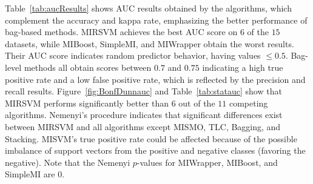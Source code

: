 \documentclass[preprint,12pt]{elsarticle}
\begin{document}
\begin{table}[b!]
{}\vspace{-0.6em}
\label{fig:BonfDunnauc}
\vspace{-0.5em}
\label{tab:statauc}
\scriptsize
{}
\end{table}
Table~\ref{tab:aucResults} shows AUC results obtained by the algorithms, which complement the accuracy and kappa rate, emphasizing the better performance of bag-based methods. MIRSVM achieves the best AUC score on $6$ of the $15$ datasets, while MIBoost, SimpleMI, and MIWrapper obtain the worst results. Their AUC score indicates random predictor behavior, having values $\leq 0.5$. Bag-level methods all obtain scores between $0.7$ and $0.75$ indicating a high true positive rate and a low false positive rate, which is reflected by the precision and recall results. Figure~\ref{fig:BonfDunnauc} and Table~\ref{tab:statauc} show that MIRSVM performs significantly better than $6$ out of the $11$ competing algorithms. Nemenyi's procedure indicates that significant differences exist between MIRSVM and all algorithms except MISMO, TLC, Bagging, and Stacking. MISVM's true positive rate could be affected because of the possible imbalance of support vectors from the positive and negative classes (favoring the negative). Note that the Nemenyi $p$-values for MIWrapper, MIBoost, and SimpleMI are $0$. 
\end{document}
